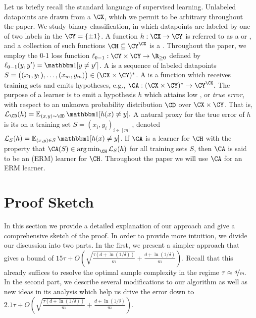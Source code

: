 Let us briefly recall the standard language of supervised learning. Unlabeled datapoints are drawn from a  $\CX$, which we permit to be arbitrary throughout the paper. We study binary classification, in which datapoints are labeled by one of two labels in the  $\CY = \{\pm 1\}$. A function $h : \CX \to \CY$ is referred to as a  or , and a collection of such functions $\CH \subseteq \CY^\CX$ is a . Throughout the paper, we employ the 0-1 loss function 
$\ell_{0-1} : \CY \times \CY \to \R_{\geq 0}$  defined by $\ell_{0-1}(y, y') = \ind [y \neq y']$. 
A  is a sequence of labeled datapoints $S = \big((x_1, y_1), \ldots, (x_m, y_m) \big) \in (\CX \times \CY)^*$. A  is a function which receives training sets and emits hypotheses, e.g., $\CA: (\CX \times \CY)^* \to \CY^\CX$. The purpose of a learner is to emit a hypothesis $h$ which attains low , or \emph{true error}, with respect to an unknown probability distribution $\CD$ over $\CX \times \CY$. That is,
$ \ls_\CD(h) = \E_{(x, y) \sim \CD} \ind [h(x) \neq y].$
A natural proxy for the true error of $h$ is its  on a training set $S = (x_i, y_i)_{i \in [m]}$, denoted $\ls_S(h) = \E_{(x, y) \in S} \ind[ h(x) \neq y]$.  
If $\CA$ is a learner for $\CH$ with the property that $\CA(S) \in \argmin_\CH \ls_S(h)$ for all training sets $S$, then $\CA$ is said to be an  (ERM) learner for $\CH$. Throughout the paper we will use $\CA$ for an ERM learner.


\section{Proof Sketch}\label{sec:proof-sketch}
In this section we provide a detailed explanation 
of our approach and give a comprehensive sketch of the 
proof. 
In order to provide more intuition, 
we divide our discussion into two parts.
In the first, we present a simpler approach
that gives a bound of $15\tau + O \left(\sqrt{\tfrac{\tau(d + \ln(1/\delta))}{m}} + \tfrac{d + \ln(1/\delta)}{m} \right).$ Recall that this already
suffices to resolve the optimal sample complexity 
in the regime $\tau \approx \nicefrac{d}{m}.$
In the second part, we describe several modifications to 
our algorithm as well as new ideas in its analysis
which help us drive the error down to 
$ 2.1\tau + O \left(\sqrt{\frac{\tau(d + \ln(1/\delta))}{m}} + \tfrac{d + \ln(1/\delta)}{m} \right).$ 


